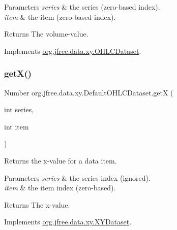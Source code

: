 \begin{DoxyParams}{Parameters}
{\em series} & the series (zero-\/based index). \\
\hline
{\em item} & the item (zero-\/based index).\\
\hline
\end{DoxyParams}
\begin{DoxyReturn}{Returns}
The volume-\/value. 
\end{DoxyReturn}


Implements \mbox{\hyperlink{interfaceorg_1_1jfree_1_1data_1_1xy_1_1_o_h_l_c_dataset_a132a37218de3b54bf308b3dcfb93cf84}{org.\+jfree.\+data.\+xy.\+O\+H\+L\+C\+Dataset}}.

\mbox{\label{classorg_1_1jfree_1_1data_1_1xy_1_1_default_o_h_l_c_dataset_aeb1a869407d3258cca101ad2408ad17c}} 
\subsubsection{\texorpdfstring{get\+X()}{getX()}}
{\footnotesize\ttfamily Number org.\+jfree.\+data.\+xy.\+Default\+O\+H\+L\+C\+Dataset.\+getX (\begin{DoxyParamCaption}\item[{int}]{series,  }\item[{int}]{item }\end{DoxyParamCaption})}

Returns the x-\/value for a data item.


\begin{DoxyParams}{Parameters}
{\em series} & the series index (ignored). \\
\hline
{\em item} & the item index (zero-\/based).\\
\hline
\end{DoxyParams}
\begin{DoxyReturn}{Returns}
The x-\/value. 
\end{DoxyReturn}


Implements \mbox{\hyperlink{interfaceorg_1_1jfree_1_1data_1_1xy_1_1_x_y_dataset_a85c75ba5b69b551e96afd29d1732ba22}{org.\+jfree.\+data.\+xy.\+X\+Y\+Dataset}}.

\mbox{\label{classorg_1_1jfree_1_1data_1_1xy_1_1_default_o_h_l_c_dataset_adcf9c5fe5882716df1ab7b8f1c77e5ff}} 
